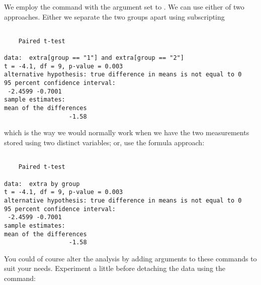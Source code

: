 We employ the  command with the  argument set to . We can use either of two approaches. Either we separate the two groups apart using subscripting 
\begin{knitrout}
\color{fgcolor}\begin{kframe}
\begin{alltt}
\hlstd{> }\hlstd{(extra[group}\hlopt{==}\hlstd{], extra[group}\hlopt{==}\hlstd{],} \hlstd{=}\hlstd{)}
\end{alltt}
\begin{verbatim}

	Paired t-test

data:  extra[group == "1"] and extra[group == "2"]
t = -4.1, df = 9, p-value = 0.003
alternative hypothesis: true difference in means is not equal to 0
95 percent confidence interval:
 -2.4599 -0.7001
sample estimates:
mean of the differences 
                  -1.58 
\end{verbatim}
\end{kframe}
\end{knitrout}
 
which is the way we would normally work when we have the two measurements stored using two distinct variables; or, use the formula approach: 
\begin{knitrout}
\color{fgcolor}\begin{kframe}
\begin{alltt}
\hlstd{> }\hlopt{~} \hlstd{=}\hlstd{)}
\end{alltt}
\begin{verbatim}

	Paired t-test

data:  extra by group
t = -4.1, df = 9, p-value = 0.003
alternative hypothesis: true difference in means is not equal to 0
95 percent confidence interval:
 -2.4599 -0.7001
sample estimates:
mean of the differences 
                  -1.58 
\end{verbatim}
\end{kframe}
\end{knitrout}
 
You could of course alter the analysis by adding arguments to these commands to suit your needs. Experiment a little before detaching the  data using the  command: 
\begin{knitrout}
\color{fgcolor}\begin{kframe}
\begin{alltt}
\hlstd{> }
\end{alltt}
\end{kframe}
\end{knitrout}
 
